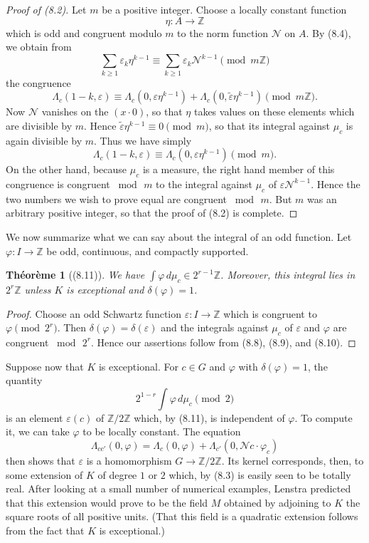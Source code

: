 \documentclass[12pt,a4paper]{article}
\theoremstyle{plain}
\newtheorem{theorem}{Th\'{e}or\`{e}me}[section]
\theoremstyle{definition}
\theoremstyle{remark}
\begin{document}
\begin{proof}[Proof of (8.2)]
Let $m$ be a positive integer. Choose a locally constant function
\[
\eta: A \to \mathbb{Z}
\]
which is odd and congruent modulo $m$ to the norm function $\mathcal{N}$ on $A$. By (8.4), we obtain from
\[
\sum_{k \ge 1} \varepsilon_k \eta^{k-1} \equiv \sum_{k \ge 1} \varepsilon_k \mathcal{N}^{k-1} \pmod{m\mathbb{Z}}
\]
the congruence
\[
\varLambda_c(1-k, \varepsilon) \equiv \varLambda_c(0, \varepsilon\eta^{k-1}) + \varLambda_c(0, \tilde{\varepsilon}\eta^{k-1}) \pmod{m\mathbb{Z}}.
\]
Now $\mathcal{N}$ vanishes on the $(x \cdot 0)$, so that $\eta$ takes values on these elements which are divisible by $m$. Hence $\tilde{\varepsilon}\eta^{k-1} \equiv 0 \pmod{m}$, so that its integral against $\mu_c$ is again divisible by $m$. Thus we have simply
\[
\varLambda_c(1-k, \varepsilon) \equiv \varLambda_c(0, \varepsilon\eta^{k-1}) \pmod{m}.
\]
On the other hand, because $\mu_c$ is a measure, the right hand member of this congruence is congruent $\bmod\, m$ to the integral against $\mu_c$ of $\varepsilon\mathcal{N}^{k-1}$. Hence the two numbers we wish to prove equal are congruent $\bmod\, m$. But $m$ was an arbitrary positive integer, so that the proof of (8.2) is complete.
\end{proof}

We now summarize what we can say about the integral of an odd function. Let $\varphi: I \to \mathbb{Z}$ be odd, continuous, and compactly supported.

\begin{theorem}[(8.11)]\label{thm:8.11}
We have $\int \varphi \, d\mu_c \in 2^{r-1}\mathbb{Z}$. Moreover, this integral lies in $2^r\mathbb{Z}$ unless $K$ is exceptional and $\delta(\varphi) = 1$.
\end{theorem}

\begin{proof}
Choose an odd Schwartz function $\varepsilon: I \to \mathbb{Z}$ which is congruent to $\varphi \pmod{2^r}$. Then $\delta(\varphi) = \delta(\varepsilon)$ and the integrals against $\mu_c$ of $\varepsilon$ and $\varphi$ are congruent $\bmod\, 2^r$. Hence our assertions follow from (8.8), (8.9), and (8.10).
\end{proof}

Suppose now that $K$ is exceptional. For $c \in G$ and $\varphi$ with $\delta(\varphi) = 1$, the quantity
\[
2^{1-r} \int \varphi \, d\mu_c \pmod{2}
\]
is an element $\varepsilon(c)$ of $\mathbb{Z}/2\mathbb{Z}$ which, by (8.11), is independent of $\varphi$. To compute it, we can take $\varphi$ to be locally constant. The equation
\[
\varLambda_{cc'}(0, \varphi) = \varLambda_c(0, \varphi) + \varLambda_{c'}(0, \mathcal{N}c \cdot \varphi_c)
\]
then shows that $\varepsilon$ is a homomorphism $G \to \mathbb{Z}/2\mathbb{Z}$. Its kernel corresponds, then, to some extension of $K$ of degree $1$ or $2$ which, by (8.3) is easily seen to be totally real. After looking at a small number of numerical examples, Lenstra predicted that this extension would prove to be the field $M$ obtained by adjoining to $K$ the square roots of all positive units. (That this field is a quadratic extension follows from the fact that $K$ is exceptional.)
\end{document}
